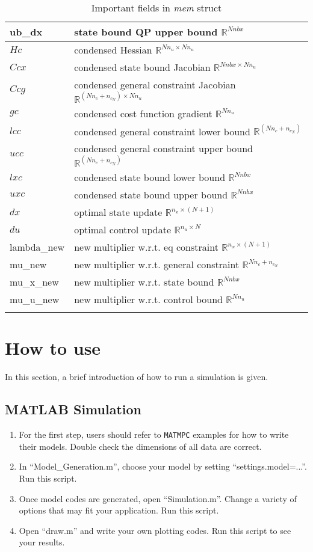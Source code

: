 \documentclass{article}
\newcommand{\software}[1]{{\tt#1}}
\newcommand{\alert}[1]{{\textit{#1}}}
\begin{document}
\begin{longtable}{l|l}
		ub\_dx & state bound QP upper bound     $\mathbb{R}^{Nnbx}$           \\\hline
		$Hc$ & condensed Hessian    $\mathbb{R}^{Nn_u\times Nn_u}$                     \\
		$Ccx$ & condensed state bound Jacobian  $\mathbb{R}^{Nnbx\times Nn_u}$          \\
		$Ccg$ & condensed general constraint Jacobian  $\mathbb{R}^{(Nn_c+n_{c_N})\times Nn_u}$    \\
		$gc$ & condensed cost function gradient  $\mathbb{R}^{Nn_u}$        \\
		$lcc$ & condensed general constraint lower bound $\mathbb{R}^{(Nn_c+n_{c_N})}$ \\
		$ucc$ & condensed general constraint upper bound $\mathbb{R}^{(Nn_c+n_{c_N})}$ \\
		$lxc$ & condensed state bound lower bound   $\mathbb{R}^{Nnbx}$      \\
		$uxc$ & condensed state bound upper bound   $\mathbb{R}^{Nnbx}$      \\\hline
		$dx$ & optimal state update     $\mathbb{R}^{n_x\times (N+1)}$                 \\
		$du$ & optimal control update   $\mathbb{R}^{n_u\times N}$                 \\
		lambda\_new & new multiplier w.r.t. eq constraint $\mathbb{R}^{n_x\times (N+1)}$      \\
		mu\_new & new multiplier w.r.t. general constraint  $\mathbb{R}^{Nn_c+n_{c_N}}$ \\
		mu\_x\_new & new multiplier w.r.t. state bound  $\mathbb{R}^{Nnbx}$       \\
		mu\_u\_new & new multiplier w.r.t. control bound  $\mathbb{R}^{Nn_u}$     \\
		\hline
	\caption{Important fields in \alert{mem} struct}
	\label{table:mem}
\end{longtable}

\section{How to use}
In this section, a brief introduction of how to run a simulation is given.

\subsection{MATLAB Simulation}
\begin{enumerate}
	\item For the first step, users should refer to \software{MATMPC} examples for how to write their models. Double check the dimensions of all data are correct.
	\item In ``Model\_Generation.m'', choose your model by setting ``settings.model=...''. Run this script.
	\item Once model codes are generated, open ``Simulation.m''. Change a variety of options that may fit your application. Run this script.
	\item Open ``draw.m'' and write your own plotting codes. Run this script to see your results.
\end{enumerate}
\end{document}
